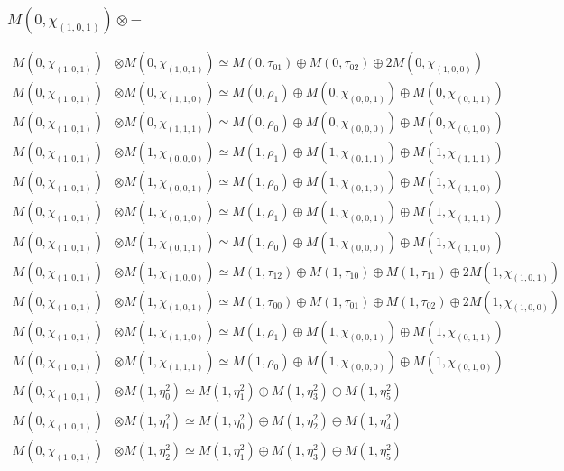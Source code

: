 \subsubsection{$ M(0,\chi_{(1,0,1)})\otimes -$}
\begin{align*}
M(0,\chi_{(1,0,1)}) &\otimes M(0,\chi_{(1,0,1)}) \simeq M(0,\tau_{01}) \oplus M(0,\tau_{02}) \oplus 2 M(0,\chi_{(1,0,0)}) \\
M(0,\chi_{(1,0,1)}) &\otimes M(0,\chi_{(1,1,0)}) \simeq M(0,\rho_{1}) \oplus M(0,\chi_{(0,0,1)}) \oplus M(0,\chi_{(0,1,1)}) \\
M(0,\chi_{(1,0,1)}) &\otimes M(0,\chi_{(1,1,1)}) \simeq M(0,\rho_{0}) \oplus M(0,\chi_{(0,0,0)}) \oplus M(0,\chi_{(0,1,0)}) \\
M(0,\chi_{(1,0,1)}) &\otimes M(1,\chi_{(0,0,0)}) \simeq M(1,\rho_{1}) \oplus M(1,\chi_{(0,1,1)}) \oplus M(1,\chi_{(1,1,1)}) \\
M(0,\chi_{(1,0,1)}) &\otimes M(1,\chi_{(0,0,1)}) \simeq M(1,\rho_{0}) \oplus M(1,\chi_{(0,1,0)}) \oplus M(1,\chi_{(1,1,0)}) \\
M(0,\chi_{(1,0,1)}) &\otimes M(1,\chi_{(0,1,0)}) \simeq M(1,\rho_{1}) \oplus M(1,\chi_{(0,0,1)}) \oplus M(1,\chi_{(1,1,1)}) \\
M(0,\chi_{(1,0,1)}) &\otimes M(1,\chi_{(0,1,1)}) \simeq M(1,\rho_{0}) \oplus M(1,\chi_{(0,0,0)}) \oplus M(1,\chi_{(1,1,0)}) \\
M(0,\chi_{(1,0,1)}) &\otimes M(1,\chi_{(1,0,0)}) \simeq M(1,\tau_{12}) \oplus M(1,\tau_{10}) \oplus M(1,\tau_{11}) \oplus 2 M(1,\chi_{(1,0,1)}) \\
M(0,\chi_{(1,0,1)}) &\otimes M(1,\chi_{(1,0,1)}) \simeq M(1,\tau_{00}) \oplus M(1,\tau_{01}) \oplus M(1,\tau_{02}) \oplus 2 M(1,\chi_{(1,0,0)}) \\
M(0,\chi_{(1,0,1)}) &\otimes M(1,\chi_{(1,1,0)}) \simeq M(1,\rho_{1}) \oplus M(1,\chi_{(0,0,1)}) \oplus M(1,\chi_{(0,1,1)}) \\
M(0,\chi_{(1,0,1)}) &\otimes M(1,\chi_{(1,1,1)}) \simeq M(1,\rho_{0}) \oplus M(1,\chi_{(0,0,0)}) \oplus M(1,\chi_{(0,1,0)}) \\
M(0,\chi_{(1,0,1)}) &\otimes M(1,\eta^{2}_{0}) \simeq M(1,\eta^{2}_{1}) \oplus M(1,\eta^{2}_{3}) \oplus M(1,\eta^{2}_{5}) \\
M(0,\chi_{(1,0,1)}) &\otimes M(1,\eta^{2}_{1}) \simeq M(1,\eta^{2}_{0}) \oplus M(1,\eta^{2}_{2}) \oplus M(1,\eta^{2}_{4}) \\
M(0,\chi_{(1,0,1)}) &\otimes M(1,\eta^{2}_{2}) \simeq M(1,\eta^{2}_{1}) \oplus M(1,\eta^{2}_{3}) \oplus M(1,\eta^{2}_{5}) \\

\end{align*}
